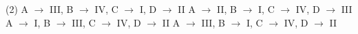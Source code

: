 \begin{tasks}(2)
    \task A $\rightarrow$ III, B $\rightarrow$ IV, C $\rightarrow$ I, D $\rightarrow$ II
    \task A $\rightarrow$ II, B $\rightarrow$ I, C $\rightarrow$ IV, D $\rightarrow$ III
    \task A $\rightarrow$ I, B $\rightarrow$ III, C $\rightarrow$ IV, D $\rightarrow$ II
    \task A $\rightarrow$ III, B $\rightarrow$ I, C $\rightarrow$ IV, D $\rightarrow$ II
\end{tasks}